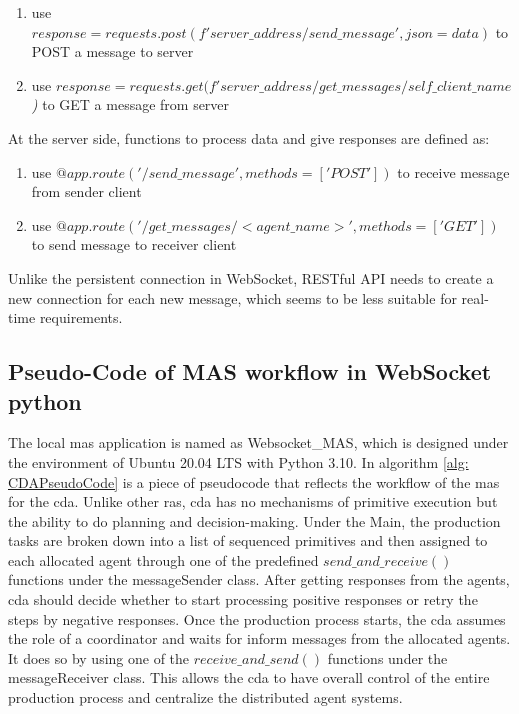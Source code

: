 \begin{enumerate}
    \item use \textit{$response = requests.post(f'{server\_address}/send\_message', json=data)$} to POST a message to server
    \item use \textit{$response = requests.get(f'{server\_address}/get\_messages/{self\_client\_name}$)} to GET a message from server
\end{enumerate}

At the server side, functions to process data and give responses are defined as:
\begin{enumerate}
    \item use \textit{$@app.route('/send\_message', methods=['POST'])$} to receive message from sender client
    \item use \textit{$@app.route('/get\_messages/<agent\_name>', methods=['GET'])$} to send message to receiver client
\end{enumerate}

Unlike the persistent connection in WebSocket, RESTful API needs to create 
a new connection for each new message, which seems to be less suitable for real-time 
requirements. 




\subsection{Pseudo-Code of MAS workflow in WebSocket python}\label{chap: Meth-WS-MAS}
The local \gls{mas} application is named as Websocket\_MAS, which is designed under the 
environment of Ubuntu 20.04 LTS with Python 3.10. 
In algorithm \ref{alg: CDAPseudoCode} is a piece of pseudocode that reflects the workflow of the \gls{mas} for the \gls{cda}. 
Unlike other \gls{ras}, \gls{cda} has no mechanisms of primitive execution but the ability to do planning and decision-making. 
Under the Main, the production tasks are broken down into a list of sequenced primitives and then assigned to each allocated agent through one of the predefined $send\_and\_receive()$ functions under the messageSender class.
After getting responses from the agents, \gls{cda} should decide whether to start processing positive responses or retry the steps by negative responses.  
Once the production process starts, the \gls{cda} assumes the role of a coordinator and waits for inform messages from the allocated agents. It does so by using one of the $receive\_and\_send()$ functions under the messageReceiver class. This allows the \gls{cda} to have overall control of the entire production process and centralize the distributed agent systems.


